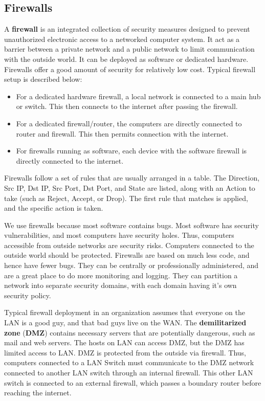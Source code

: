 \documentclass[11pt]{article}
\theoremstyle{plain} %
\theoremstyle{definition}
\theoremstyle{example}
\theoremstyle{remark}
\begin{document}
\subsection{Firewalls}
A \textbf{firewall} is an integrated collection of security measures designed to prevent unauthorized electronic access to a networked computer system. It act as a barrier between a private network and a public network to limit communication with the outside world. It can be deployed as software or dedicated hardware. Firewalls offer a good amount of security for relatively low cost. Typical firewall setup is described below:
\begin{itemize}
	\item For a dedicated hardware firewall, a local network is connected to a main hub or switch. This then connects to the internet after passing the firewall. 
	\item For a dedicated firewall/router, the computers are directly connected to router and firewall. This then permits connection with the internet. 
	\item For firewalls running as software, each device with the software firewall is directly connected to the internet. 
\end{itemize}


Firewalls follow a set of rules that are usually arranged in a table. The Direction, Src IP, Dst IP, Src Port, Dst Port, and State are listed, along with an Action to take (such as Reject, Accept, or Drop). The first rule that matches is applied, and the specific action is taken. 

We use firewalls because most software contains bugs. Most software has security vulnerabilities, and most computers have security holes. Thus, computers accessible from outside networks are security risks. Computers connected to the outside world should be protected. Firewalls
are based on much less code, and hence have fewer bugs. They can be centrally or professionally administered, and are a great place to do more monitoring and logging. They can partition a network into separate security domains, with each domain having it's own security policy. 

Typical firewall deployment in an organization assumes that everyone on the LAN is a good guy, and that bad guys live on the WAN. The \textbf{demilitarized zone} (\textbf{DMZ}) contains necessary servers that are potentially dangerous, such as mail and web servers. The hosts on LAN can access DMZ, but the DMZ has limited access to LAN. DMZ is protected from the outside via firewall. Thus, computers connected to a LAN Switch must communicate to the DMZ network connected to another LAN switch through an internal firewall. This other LAN switch is connected to an external firewall, which passes a boundary router before reaching the internet. 
\end{document}
